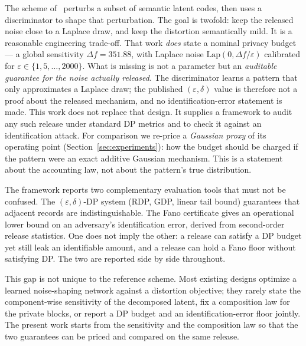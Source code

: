 \documentclass[10pt,twocolumn,letterpaper]{article}
\theoremstyle{plain}
\theoremstyle{definition}
\begin{document}
The scheme of~\cite{arXiv2510} perturbs a subset of semantic latent codes, then uses a discriminator
to shape that perturbation. The goal is twofold: keep the released noise close to a
Laplace draw, and keep the distortion semantically mild. It is a reasonable engineering
trade-off. That work \emph{does} state a nominal privacy budget --- a global sensitivity $\Delta f=351.88$,
with Laplace noise $\mathrm{Lap}(0,\Delta f/\varepsilon)$ calibrated for $\varepsilon\in\{1,5,\ldots,2000\}$. What is missing is not a parameter but an
\emph{auditable guarantee for the noise actually released}. The discriminator learns a pattern that only approximates a Laplace draw; the
published $(\varepsilon,\delta)$ value is therefore not a proof about the released mechanism, and no
identification-error statement is made. This work does not replace that design. It
supplies a framework to audit any such release under standard DP metrics and to check it
against an identification attack. For comparison we re-price a \emph{Gaussian proxy} of its operating
point (Section~\ref{sec:experiments}): how the budget should be charged if the pattern were an exact
additive Gaussian mechanism. This is a statement about the accounting law, not about the
pattern's true distribution.

The framework reports two complementary evaluation tools that must not be
confused. The $(\varepsilon,\delta)$-DP system (RDP, GDP, linear tail bound)
guarantees that adjacent records are indistinguishable. The Fano certificate
gives an operational lower bound on an adversary's identification error,
derived from second-order release statistics. One does not imply the other: a
release can satisfy a DP budget yet still leak an identifiable amount, and a
release can hold a Fano floor without satisfying DP. The two are reported side
by side throughout.

This gap is not unique to the reference scheme. Most existing designs optimize a learned
noise-shaping network against a distortion objective; they rarely state the
component-wise sensitivity of the decomposed latent, fix a composition law for
the private blocks, or report a DP budget and an identification-error floor
jointly. The present work starts from the sensitivity and the composition law
so that the two guarantees can be priced and compared on the same release.
\end{document}
